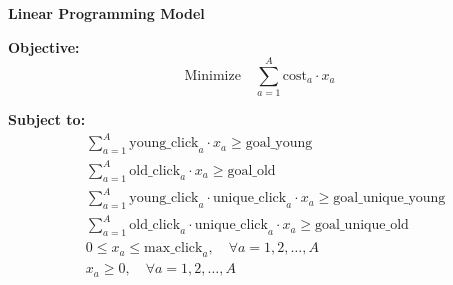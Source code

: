 \documentclass{article}
\begin{document}
\textbf{Linear Programming Model}

\textbf{Objective:}
\[
\text{Minimize} \quad \sum_{a=1}^{A} \text{cost}_a \cdot x_a
\]

\textbf{Subject to:}
\begin{align*}
& \sum_{a=1}^{A} \text{young\_click}_a \cdot x_a \geq \text{goal\_young} \\
& \sum_{a=1}^{A} \text{old\_click}_a \cdot x_a \geq \text{goal\_old} \\
& \sum_{a=1}^{A} \text{young\_click}_a \cdot \text{unique\_click}_a \cdot x_a \geq \text{goal\_unique\_young} \\
& \sum_{a=1}^{A} \text{old\_click}_a \cdot \text{unique\_click}_a \cdot x_a \geq \text{goal\_unique\_old} \\
& 0 \leq x_a \leq \text{max\_click}_a, \quad \forall a = 1, 2, \ldots, A \\
& x_a \geq 0, \quad \forall a = 1, 2, \ldots, A
\end{align*}
\end{document}
